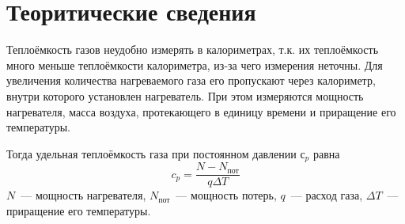 \section{Теоритические сведения}
Теплоёмкость газов неудобно измерять в калориметрах, т.к. их теплоёмкость много меньше теплоёмкости
калориметра, из-за чего измерения неточны. Для увеличения количества нагреваемого газа
его пропускают через калориметр, внутри которого установлен нагреватель. При этом
измеряются мощность нагревателя, масса воздуха, протекающего в единицу времени и
приращение его температуры.

Тогда удельная теплоёмкость газа при постоянном давлении $с_p$ равна
\[c_p=\frac{N-N_\text{пот}}{q\Delta T}\]
$N$~--- мощность нагревателя, $N_\text{пот}$~--- мощность потерь, $q$~--- расход газа,
$\Delta T$~--- приращение его температуры.
